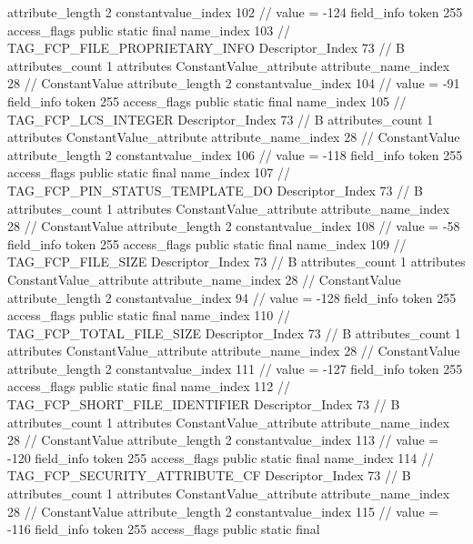 {{{{{{{					attribute_length	2
					constantvalue_index	102		// value = -124
				}
				}
			}
			field_info {
				token	255
				access_flags	public static final
				name_index	103		// TAG_FCP_FILE_PROPRIETARY_INFO
				Descriptor_Index	73		// B
				attributes_count	1
				attributes {
				ConstantValue_attribute {
					attribute_name_index	28		// ConstantValue
					attribute_length	2
					constantvalue_index	104		// value = -91
				}
				}
			}
			field_info {
				token	255
				access_flags	public static final
				name_index	105		// TAG_FCP_LCS_INTEGER
				Descriptor_Index	73		// B
				attributes_count	1
				attributes {
				ConstantValue_attribute {
					attribute_name_index	28		// ConstantValue
					attribute_length	2
					constantvalue_index	106		// value = -118
				}
				}
			}
			field_info {
				token	255
				access_flags	public static final
				name_index	107		// TAG_FCP_PIN_STATUS_TEMPLATE_DO
				Descriptor_Index	73		// B
				attributes_count	1
				attributes {
				ConstantValue_attribute {
					attribute_name_index	28		// ConstantValue
					attribute_length	2
					constantvalue_index	108		// value = -58
				}
				}
			}
			field_info {
				token	255
				access_flags	public static final
				name_index	109		// TAG_FCP_FILE_SIZE
				Descriptor_Index	73		// B
				attributes_count	1
				attributes {
				ConstantValue_attribute {
					attribute_name_index	28		// ConstantValue
					attribute_length	2
					constantvalue_index	94		// value = -128
				}
				}
			}
			field_info {
				token	255
				access_flags	public static final
				name_index	110		// TAG_FCP_TOTAL_FILE_SIZE
				Descriptor_Index	73		// B
				attributes_count	1
				attributes {
				ConstantValue_attribute {
					attribute_name_index	28		// ConstantValue
					attribute_length	2
					constantvalue_index	111		// value = -127
				}
				}
			}
			field_info {
				token	255
				access_flags	public static final
				name_index	112		// TAG_FCP_SHORT_FILE_IDENTIFIER
				Descriptor_Index	73		// B
				attributes_count	1
				attributes {
				ConstantValue_attribute {
					attribute_name_index	28		// ConstantValue
					attribute_length	2
					constantvalue_index	113		// value = -120
				}
				}
			}
			field_info {
				token	255
				access_flags	public static final
				name_index	114		// TAG_FCP_SECURITY_ATTRIBUTE_CF
				Descriptor_Index	73		// B
				attributes_count	1
				attributes {
				ConstantValue_attribute {
					attribute_name_index	28		// ConstantValue
					attribute_length	2
					constantvalue_index	115		// value = -116
				}
				}
			}
			field_info {
				token	255
				access_flags	public static final
}}}}}
